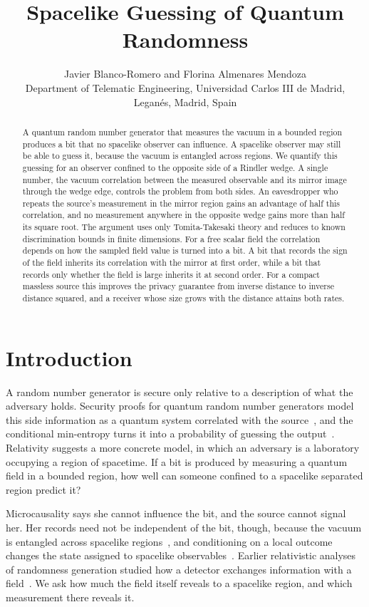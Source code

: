 \documentclass[11pt,a4paper]{article}
\title{Spacelike Guessing of Quantum Randomness}
\author{Javier Blanco-Romero and Florina Almenares Mendoza\\\small Department of Telematic Engineering, Universidad Carlos III de Madrid,\\Legan\'es, Madrid, Spain}
\date{}
\begin{document}
\maketitle
\begin{abstract}
A quantum random number generator that measures the vacuum in a bounded region produces a bit that no spacelike observer can influence. A spacelike observer may still be able to guess it, because the vacuum is entangled across regions. We quantify this guessing for an observer confined to the opposite side of a Rindler wedge. A single number, the vacuum correlation between the measured observable and its mirror image through the wedge edge, controls the problem from both sides. An eavesdropper who repeats the source's measurement in the mirror region gains an advantage of half this correlation, and no measurement anywhere in the opposite wedge gains more than half its square root. The argument uses only Tomita-Takesaki theory and reduces to known discrimination bounds in finite dimensions. For a free scalar field the correlation depends on how the sampled field value is turned into a bit. A bit that records the sign of the field inherits its correlation with the mirror at first order, while a bit that records only whether the field is large inherits it at second order. For a compact massless source this improves the privacy guarantee from inverse distance to inverse distance squared, and a receiver whose size grows with the distance attains both rates.
\end{abstract}

\section{Introduction}
\label{sec:intro}

A random number generator is secure only relative to a description of what the adversary holds. Security proofs for quantum random number generators model this side information as a quantum system correlated with the source~\cite{herrero2017quantum}, and the conditional min-entropy turns it into a probability of guessing the output~\cite{koenig2009operational}. Relativity suggests a more concrete model, in which an adversary is a laboratory occupying a region of spacetime. If a bit is produced by measuring a quantum field in a bounded region, how well can someone confined to a spacelike separated region predict it?

Microcausality says she cannot influence the bit, and the source cannot signal her. Her records need not be independent of the bit, though, because the vacuum is entangled across spacelike regions~\cite{summers1987maximal,reznik2003entanglement,pozas2015harvesting}, and conditioning on a local outcome changes the state assigned to spacelike observables~\cite{fewster2020quantum}. Earlier relativistic analyses of randomness generation studied how a detector exchanges information with a field~\cite{thinh2016certified,lopp2018light}. We ask how much the field itself reveals to a spacelike region, and which measurement there reveals it.
\end{document}
